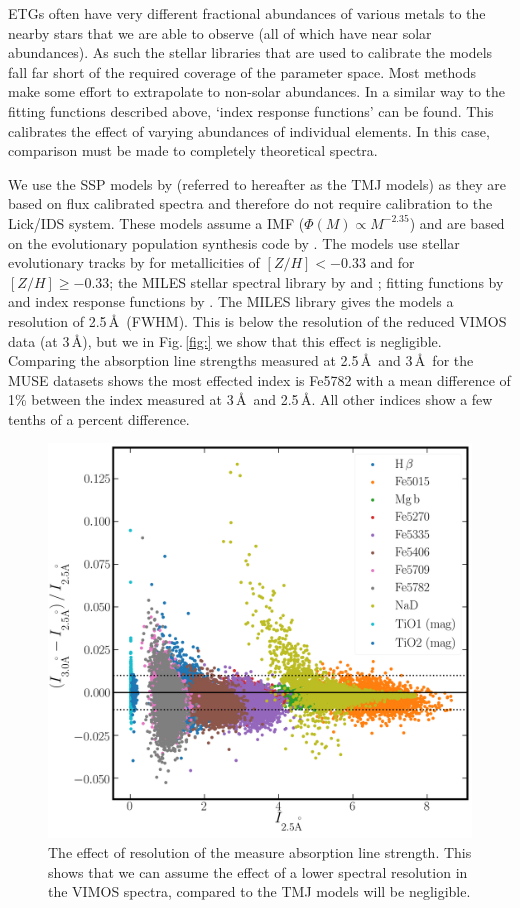			ETGs often have very different fractional abundances of various metals to the nearby stars that we are able to observe (all of which have near solar abundances). As such the stellar libraries that are used to calibrate the models fall far short of the required coverage of the parameter space. Most methods make some effort to extrapolate to non-solar abundances. In a similar way to the fitting functions described above, `index response functions' can be found. This calibrates the effect of varying abundances of individual elements. In this case, comparison must be made to completely theoretical spectra.

			We use the SSP models by \citet{Thomas2010} (referred to hereafter as the TMJ models) as they are based on flux calibrated spectra and therefore do not require calibration to the Lick/IDS system. These models assume a \citet{Salpeter1955} IMF ($\Phi(M) \propto M^{-2.35}$) and are based on the evolutionary population synthesis code by \citet{Maraston1998}. The models use stellar evolutionary tracks by \citet{Cassisi1997} for metallicities of $[Z/H] < -0.33$ and \citet{Girardi2000} for $[Z/H] \ge -0.33$; the MILES stellar spectral library by \citet{Sanchez-Blazquez2006a} and \citet{Falcon-Barroso2011a}; fitting functions by \citet{Johansson2010} and index response functions by \citet{Korn2005}. The MILES library gives the models a resolution of 2.5\,\AA\ (FWHM). This is below the resolution of the reduced VIMOS data (at 3\,\AA), but we in Fig.\,\ref{fig:} we show that this effect is negligible. Comparing the absorption line strengths measured at 2.5\,\AA\ and 3\,\AA\ for the MUSE datasets shows the most effected index is Fe5782 with a mean difference of 1\% between the index measured at 3\,\AA\ and 2.5\,\AA. All other indices show a few tenths of a percent difference. 

			\begin{figure}
				\centering
				\includegraphics[width=.7\textwidth]{chapter2/compare_resolutions.png}
				\caption[Affect of resolution on absorption line index strength]{The effect of resolution of the measure absorption line strength. This shows that we can assume the effect of a lower spectral resolution in the VIMOS spectra, compared to the TMJ models will be negligible.}
				\label{fig:MassRe}
			\end{figure}

